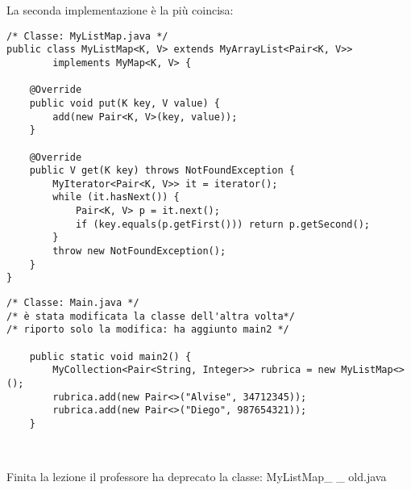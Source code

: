 \noindent La seconda implementazione è la più coincisa:

\begin{lstlisting}
/* Classe: MyListMap.java */
public class MyListMap<K, V> extends MyArrayList<Pair<K, V>>
        implements MyMap<K, V> {

    @Override
    public void put(K key, V value) {
        add(new Pair<K, V>(key, value));
    }

    @Override
    public V get(K key) throws NotFoundException {
        MyIterator<Pair<K, V>> it = iterator();
        while (it.hasNext()) {
            Pair<K, V> p = it.next();
            if (key.equals(p.getFirst())) return p.getSecond();
        }
        throw new NotFoundException();
    }
}
\end{lstlisting}

\begin{lstlisting}
/* Classe: Main.java */
/* è stata modificata la classe dell'altra volta*/
/* riporto solo la modifica: ha aggiunto main2 */

    public static void main2() {
        MyCollection<Pair<String, Integer>> rubrica = new MyListMap<>();
        rubrica.add(new Pair<>("Alvise", 34712345));
        rubrica.add(new Pair<>("Diego", 987654321));
    }



\end{lstlisting}

\noindent Finita la lezione il professore ha deprecato la classe: MyListMap\_ \_ old.java